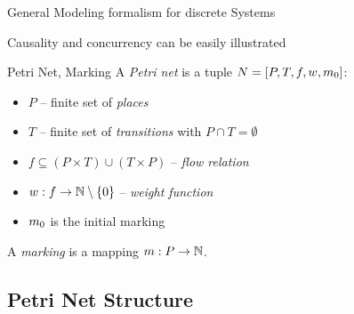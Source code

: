 \documentclass[11pt]{presentation}
\begin{document}
\begin{frame}{General}
	Modeling formalism for discrete Systems

	\medskip
	Causality and concurrency can be easily illustrated

	\medskip
	\begin{defi}{Petri Net, Marking \cite{desel_placetransition_1996}}{}
		A \emph{Petri net} is a tuple $ N = [P,T,f,w,\marking[0]] $:
		\begin{itemize}
			\item $ P $ --  finite set of \emph{places}
			\item $ T $ -- finite set of \emph{transitions} with $ P \cap T = \emptyset $
			\item $ f \subseteq (P \times T) \cup (T \times P) $ -- \emph{flow relation}
			\item $ w : f \rightarrow \mathbb{N} \setminus \{0\} $ -- \emph{weight function}
			\item  $ \marking[0] $ is the initial marking\\
		\end{itemize}
		A \emph{marking} is a mapping $ \marking : P \rightarrow \nat $.
	\end{defi}
\end{frame}

\subsection{Petri Net Structure}
\end{document}
